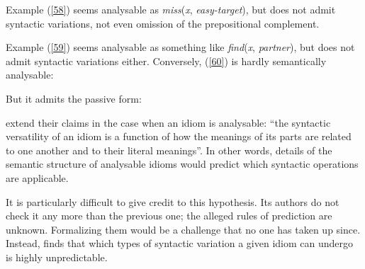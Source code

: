 \documentclass[output=paper]{langsci/langscibook}
\begin{document}
\begin{exe}
\end{exe}

\noindent Example (\ref{58}) seems analysable as \textit{miss}(\textit{x}, \textit{easy-target}), but does not admit syntactic variations, not even omission of the prepositional complement.

\begin{exe}
\end{exe}



\noindent Example (\ref{59}) seems analysable as something like \textit{find}(\textit{x}, \textit{partner}), but does not admit syntactic variations either. Conversely, (\ref{60}) is hardly semantically analysable:

\begin{exe}
\end{exe}

\noindent But it admits the passive form:

\begin{exe}
\end{exe}

\cite[512]{Nunberg1994}  extend their claims in the case when an idiom is analysable: “the syntactic versatility of an idiom is a function of how the meanings of its parts are related to one another and to their literal meanings”. In other words, details of the semantic structure of analysable idioms would predict which syntactic operations are applicable.

It is particularly difficult to give credit to this hypothesis. Its authors do not check it any more than the previous one; the alleged rules of prediction are unknown. Formalizing them would be a challenge that no one has taken up since. Instead, \citet{Riehemann:01} finds that which types of syntactic variation a given idiom can undergo is highly unpredictable.
\end{document}
